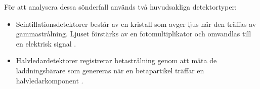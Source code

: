 För att analysera dessa sönderfall används två huvudsakliga detektortyper:
%
\begin{itemize}
    \item Scintillationsdetektorer består av en kristall som avger
    ljus när den träffas av gammastrålning. Ljuset förstärks av en
    fotomultiplikator och omvandlas till en elektrisk signal
    \parencite{radiation}.

    \item Halvledardetektorer registrerar betastrålning genom att mäta
    de laddningsbärare som genereras när en betapartikel träffar en
    halvledarkomponent \parencite{spectrometry}.
\end{itemize}
